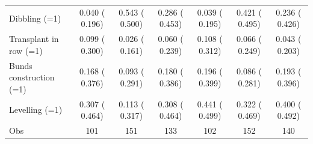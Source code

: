 \begin{tabular}{lcccccc}
Dibbling (=1) &     0.040 (    0.196) &     0.543 (    0.500)\sym{**} &     0.286 (    0.453) &     0.039 (    0.195) &     0.421 (    0.495)\sym{**} &     0.236 (    0.426) \\
Transplant in row (=1) &     0.099 (    0.300) &     0.026 (    0.161) &     0.060 (    0.239) &     0.108 (    0.312) &     0.066 (    0.249) &     0.043 (    0.203) \\
Bunds construction (=1) &     0.168 (    0.376) &     0.093 (    0.291) &     0.180 (    0.386) &     0.196 (    0.399) &     0.086 (    0.281) &     0.193 (    0.396) \\
Levelling (=1) &     0.307 (    0.464) &     0.113 (    0.317)\sym{*} &     0.308 (    0.464) &     0.441 (    0.499) &     0.322 (    0.469) &     0.400 (    0.492) \\
\midrule
Obs &       101 &       151 &       133 &       102 &       152 &       140 \\
\bottomrule
\end{tabular}
